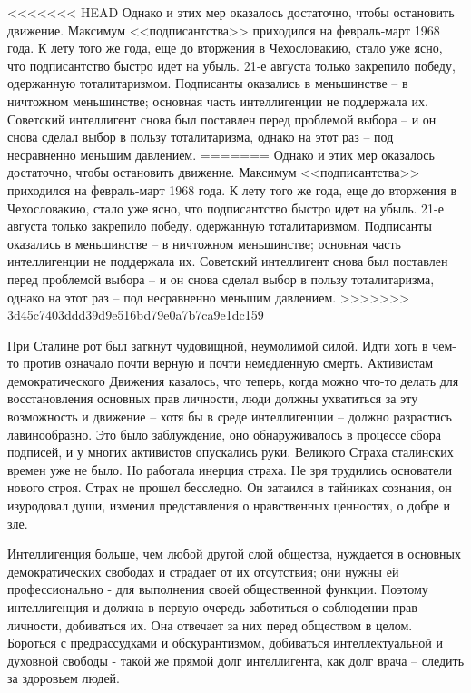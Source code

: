 \documentclass{book}
\begin{document}
<<<<<<< HEAD
Однако и этих мер оказалось достаточно, чтобы остановить движение. Максимум <<подписантства>> приходился на фев­раль‑март 1968 года. К лету того же года, еще до вторжения в Чехословакию, стало уже ясно, что подписантство быстро идет на убыль. 21‑е августа только закрепило победу, одер­жанную тоталитаризмом. Подписанты оказались в меньшинст­ве -- в ничтожном меньшинстве; основная часть интеллиген­ции не поддержала их. Советский интеллигент снова был по­ставлен перед проблемой выбора -- и он снова сделал выбор в пользу тоталитаризма, однако на этот раз -- под несравненно меньшим давлением.
=======
Однако и этих мер оказалось достаточно, чтобы остановить движение. Максимум <<подписантства>> приходился на фев­раль-март 1968 года. К лету того же года, еще до вторжения в Чехословакию, стало уже ясно, что подписантство быстро идет на убыль. 21-е августа только закрепило победу, одер­жанную тоталитаризмом. Подписанты оказались в меньшинст­ве -- в ничтожном меньшинстве; основная часть интеллиген­ции не поддержала их. Советский интеллигент снова был по­ставлен перед проблемой выбора -- и он снова сделал выбор в пользу тоталитаризма, однако на этот раз -- под несравненно меньшим давлением.
>>>>>>> 3d45c7403ddd39d9e516bd79e0a7b7ca9e1dc159

При Сталине рот был заткнут чудовищной, неумолимой силой. Идти хоть в чем-то против означало почти верную и почти немедленную смерть. Активистам демократического Движения казалось, что теперь, когда можно что-то делать для восстановления основных прав личности, люди должны ухватиться за эту возможность и движение -- хотя бы в среде интеллигенции -- должно разрастись лавинообразно. Это было заблуждение, оно обнаруживалось в процессе сбора под­писей, и у многих активистов опускались руки. Великого Стра­ха сталинских времен уже не было. Но работала инерция стра­ха. Не зря трудились основатели нового строя. Страх не про­шел бесследно. Он затаился в тайниках сознания, он изуродовал души, изменил представления о нравственных ценностях, о добре и зле.

Интеллигенция больше, чем любой другой слой общества, нуждается в основных демократических свободах и страдает от их отсутствия; они нужны ей профессионально - для выполнения своей общественной функции. Поэтому интеллигенция и должна в первую очередь заботиться о соблюдении прав личности, добиваться их. Она отвечает за них перед обществом в целом. Бороться с предрассудками и обскурантизмом, добиваться интеллектуальной и духовной свободы - такой же прямой долг интеллигента, как долг врача -- следить за здоровьем людей.
\end{document}
